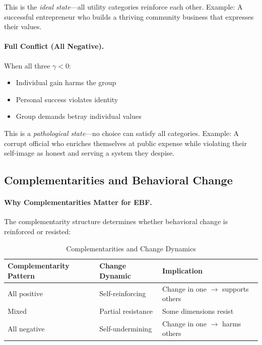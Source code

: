 This is the \emph{ideal state}---all utility categories reinforce each other.
Example: A successful entrepreneur who builds a thriving community business 
that expresses their values.

\paragraph{Full Conflict (All Negative).}
When all three $\gamma < 0$:
\begin{itemize}
\item Individual gain harms the group
\item Personal success violates identity
\item Group demands betray individual values
\end{itemize}

This is a \emph{pathological state}---no choice can satisfy all categories.
Example: A corrupt official who enriches themselves at public expense while 
violating their self-image as honest and serving a system they despise.

\subsection{Complementarities and Behavioral Change}

\paragraph{Why Complementarities Matter for EBF.}
The complementarity structure determines whether behavioral change is 
reinforced or resisted:

\begin{table}[htbp]
\centering
\caption{Complementarities and Change Dynamics}
\label{tab:app-c-complementarities-change}
\renewcommand{\arraystretch}{1.3}
\begin{tabular}{@{}lll@{}}
\toprule
\textbf{Complementarity Pattern} & \textbf{Change Dynamic} & \textbf{Implication} \\
\midrule
All positive & Self-reinforcing & Change in one $\to$ supports others \\
Mixed & Partial resistance & Some dimensions resist \\
All negative & Self-undermining & Change in one $\to$ harms others \\
\bottomrule
\end{tabular}
\end{table}

